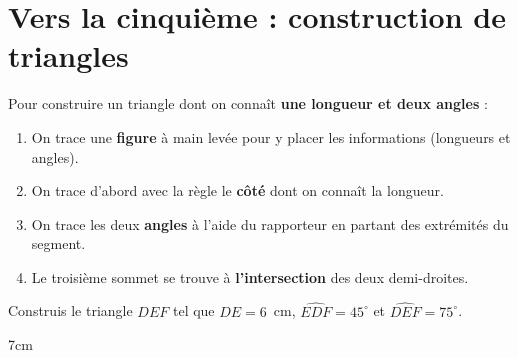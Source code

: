 \documentclass[a4paper]{book}
\begin{document}
    \vspace{0.5cm}
    
\section{Vers la cinquième : construction de triangles}
    
    \begin{methode}
        Pour construire un triangle dont on connaît \textbf{une longueur et deux angles} :
        \begin{enumerate}
            \item On trace une \textbf{figure} à main levée pour y placer les informations (longueurs et angles).
            \item On trace d'abord avec la règle le \textbf{côté} dont on connaît la longueur.
            \item On trace les deux \textbf{angles} à l'aide du rapporteur en partant des extrémités du segment.
            \item Le troisième sommet se trouve à \textbf{l'intersection} des deux demi-droites.
        \end{enumerate}
    \end{methode}
    
    \begin{exemple}
        Construis le triangle $DEF$ tel que $DE = 6$~cm, $\widehat{EDF} = 45^\circ$ et $\widehat{DEF} = 75^\circ$.
        
        \begin{ZoneReponse}{7cm}
        \end{ZoneReponse}
    \end{exemple}
\end{document}
